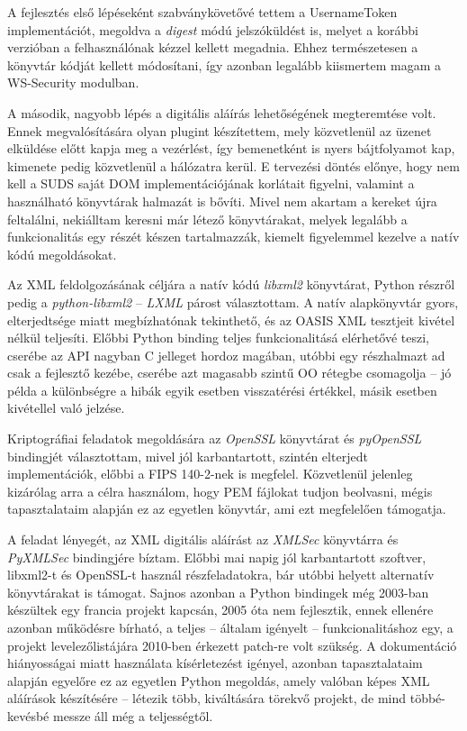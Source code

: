 \bigskip

A fejlesztés első lépéseként szabványkövetővé tettem a UsernameToken implementációt, megoldva a \emph{digest} módú jelszóküldést is, melyet a korábbi verzióban a felhasználónak kézzel kellett megadnia. Ehhez természetesen a könyvtár kódját kellett módosítani, így azonban legalább kiismertem magam a WS\hyp{}Security modulban.

A második, nagyobb lépés a digitális aláírás lehetőségének megteremtése volt. Ennek megvalósítására olyan plugint készítettem, mely közvetlenül az üzenet elküldése előtt kapja meg a vezérlést, így bemenetként is nyers bájtfolyamot kap, kimenete pedig közvetlenül a hálózatra kerül. E tervezési döntés előnye, hogy nem kell a SUDS saját DOM implementációjának korlátait figyelni, valamint a használható könyvtárak halmazát is bővíti. Mivel nem akartam a kereket újra feltalálni, nekiálltam keresni már létező könyvtárakat, melyek legalább a funkcionalitás egy részét készen tartalmazzák, kiemelt figyelemmel kezelve a natív kódú megoldásokat.

Az XML feldolgozásának céljára a natív kódú \emph{libxml2} könyvtárat, Python részről pedig a \emph{python-libxml2} -- \emph{LXML} párost választottam. A natív alapkönyvtár gyors, elterjedtsége miatt megbízhatónak tekinthető, és az OASIS XML tesztjeit kivétel nélkül teljesíti. Előbbi Python binding teljes funkcionalitásá elérhetővé teszi, cserébe az API nagyban C jelleget hordoz magában, utóbbi egy részhalmazt ad csak a fejlesztő kezébe, cserébe azt magasabb szintű OO rétegbe csomagolja -- jó példa a különbségre a hibák egyik esetben visszatérési értékkel, másik esetben kivétellel való jelzése.

Kriptográfiai feladatok megoldására az \emph{OpenSSL} könyvtárat és \emph{pyOpenSSL} bindingjét választottam, mivel jól karbantartott, szintén elterjedt implementációk, előbbi a FIPS 140-2-nek is megfelel. Közvetlenül jelenleg kizárólag arra a célra használom, hogy PEM fájlokat tudjon beolvasni, mégis tapasztalataim alapján ez az egyetlen könyvtár, ami ezt megfelelően támogatja.

A feladat lényegét, az XML digitális aláírást az \emph{XMLSec} könyvtárra és \emph{PyXMLSec} bindingjére bíztam. Előbbi mai napig jól karbantartott szoftver, libxml2-t és OpenSSL-t használ részfeladatokra, bár utóbbi helyett alternatív könyvtárakat is támogat. Sajnos azonban a Python bindingek még 2003-ban készültek egy francia projekt kapcsán, 2005 óta nem fejlesztik, ennek ellenére azonban működésre bírható, a teljes -- általam igényelt -- funkcionalitáshoz egy, a projekt levelezőlistájára 2010-ben érkezett patch-re volt szükség. A dokumentáció hiányosságai miatt használata kísérletezést igényel, azonban tapasztalataim alapján egyelőre ez az egyetlen Python megoldás, amely valóban képes XML aláírások készítésére -- létezik több, kiváltására törekvő projekt, de mind többé-kevésbé messze áll még a teljességtől.

